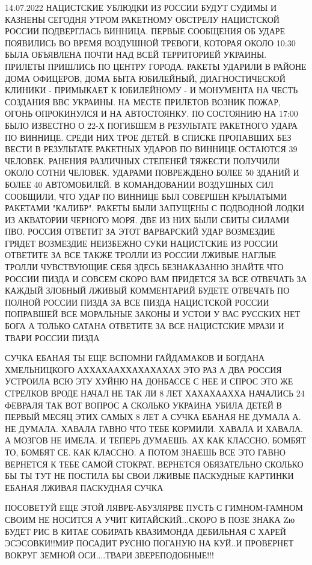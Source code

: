 14.07.2022
НАЦИСТСКИЕ УБЛЮДКИ ИЗ РОССИИ БУДУТ СУДИМЫ И КАЗНЕНЫ СЕГОДНЯ УТРОМ РАКЕТНОМУ
ОБСТРЕЛУ НАЦИСТСКОЙ РОССИИ ПОДВЕРГЛАСЬ ВИННИЦА. ПЕРВЫЕ СООБЩЕНИЯ ОБ УДАРЕ
ПОЯВИЛИСЬ ВО ВРЕМЯ ВОЗДУШНОЙ ТРЕВОГИ, КОТОРАЯ ОКОЛО 10:30 БЫЛА ОБЪЯВЛЕНА ПОЧТИ
НАД ВСЕЙ ТЕРРИТОРИЕЙ УКРАИНЫ. ПРИЛЕТЫ ПРИШЛИСЬ ПО ЦЕНТРУ ГОРОДА. РАКЕТЫ УДАРИЛИ
В РАЙОНЕ ДОМА ОФИЦЕРОВ, ДОМА БЫТА ЮБИЛЕЙНЫЙ, ДИАГНОСТИЧЕСКОЙ КЛИНИКИ
- ПРИМЫКАЕТ К ЮБИЛЕЙНОМУ - И МОНУМЕНТА НА ЧЕСТЬ СОЗДАНИЯ ВВС УКРАИНЫ.  НА МЕСТЕ
ПРИЛЕТОВ ВОЗНИК ПОЖАР, ОГОНЬ ОПРОКИНУЛСЯ И НА АВТОСТОЯНКУ. ПО СОСТОЯНИЮ НА
17:00 БЫЛО ИЗВЕСТНО О 22-Х ПОГИБШЕМ В РЕЗУЛЬТАТЕ РАКЕТНОГО УДАРА ПО ВИННИЦЕ.
СРЕДИ НИХ ТРОЕ ДЕТЕЙ. В СПИСКЕ ПРОПАВШИХ БЕЗ ВЕСТИ В РЕЗУЛЬТАТЕ РАКЕТНЫХ УДАРОВ
ПО ВИННИЦЕ ОСТАЮТСЯ 39 ЧЕЛОВЕК. РАНЕНИЯ РАЗЛИЧНЫХ СТЕПЕНЕЙ ТЯЖЕСТИ ПОЛУЧИЛИ
ОКОЛО СОТНИ ЧЕЛОВЕК. УДАРАМИ ПОВРЕЖДЕНО БОЛЕЕ 50 ЗДАНИЙ И БОЛЕЕ 40 АВТОМОБИЛЕЙ.
В КОМАНДОВАНИИ ВОЗДУШНЫХ СИЛ СООБЩИЛИ, ЧТО УДАР ПО ВИННИЦЕ БЫЛ СОВЕРШЕН
КРЫЛАТЫМИ РАКЕТАМИ "КАЛИБР". РАКЕТЫ БЫЛИ ЗАПУЩЕНЫ С ПОДВОДНОЙ ЛОДКИ ИЗ
АКВАТОРИИ ЧЕРНОГО МОРЯ. ДВЕ ИЗ НИХ БЫЛИ СБИТЫ СИЛАМИ ПВО.  РОССИЯ ОТВЕТИТ ЗА
ЭТОТ ВАРВАРСКИЙ УДАР ВОЗМЕЗДИЕ ГРЯДЕТ ВОЗМЕЗДИЕ НЕИЗБЕЖНО СУКИ НАЦИСТСКИЕ ИЗ
РОССИИ ОТВЕТИТЕ ЗА ВСЕ ТАКЖЕ ТРОЛЛИ ИЗ РОССИИ ЛЖИВЫЕ НАГЛЫЕ ТРОЛЛИ ЧУВСТВУЮЩИЕ
СЕБЯ ЗДЕСЬ БЕЗНАКАЗАННО ЗНАЙТЕ ЧТО РОССИИ ПИЗДА И СОВСЕМ СКОРО ВАМ ПРИДЕТСЯ ЗА
ВСЕ ОТВЕЧАТЬ ЗА КАЖДЫЙ ЗЛОБНЫЙ ЛЖИВЫЙ КОММЕНТАРИЙ БУДЕТЕ ОТВЕЧАТЬ ПО ПОЛНОЙ
РОССИИ ПИЗДА ЗА ВСЕ ПИЗДА НАЦИСТСКОЙ РОССИИ ПОПРАВШЕЙ ВСЕ МОРАЛЬНЫЕ ЗАКОНЫ И
УСТОИ У ВАС РУССКИХ НЕТ БОГА А ТОЛЬКО САТАНА ОТВЕТИТЕ ЗА ВСЕ НАЦИСТСКИЕ МРАЗИ И
ТВАРИ РОССИИ ПИЗДА

СУЧКА ЕБАНАЯ ТЫ ЕЩЕ ВСПОМНИ ГАЙДАМАКОВ И БОГДАНА ХМЕЛЬНИЦКОГО АХХАХААХХАХАХАХАХ
ЭТО РАЗ А ДВА РОССИЯ УСТРОИЛА ВСЮ ЭТУ ХУЙНЮ НА ДОНБАССЕ С НЕЕ И СПРОС ЭТО ЖЕ
СТРЕЛКОВ ВРОДЕ НАЧАЛ НЕ ТАК ЛИ 8 ЛЕТ ХАХАХААХХА НАЧАЛИСЬ 24 ФЕВРАЛЯ ТАК ВОТ
ВОПРОС А СКОЛЬКО УКРАИНА УБИЛА ДЕТЕЙ В ПЕРВЫЙ МЕСЯЦ ЭТИХ САМЫХ 8 ЛЕТ А СУЧКА
ЕБАНАЯ НЕ ДУМАЛА А. НЕ ДУМАЛА. ХАВАЛА ГАВНО ЧТО ТЕБЕ КОРМИЛИ. ХАВАЛА И ХАВАЛА.
А МОЗГОВ НЕ ИМЕЛА. И ТЕПЕРЬ ДУМАЕШЬ. АХ КАК КЛАССНО. БОМБЯТ ТО, БОМБЯТ СЕ. КАК
КЛАССНО. А ПОТОМ ЗНАЕШЬ ВСЕ ЭТО ГАВНО ВЕРНЕТСЯ К ТЕБЕ САМОЙ СТОКРАТ. ВЕРНЕТСЯ
ОБЯЗАТЕЛЬНО СКОЛЬКО БЫ ТЫ ТУТ НЕ ПОСТИЛА БЫ СВОИ ЛЖИВЫЕ ПАСКУДНЫЕ КАРТИНКИ
ЕБАНАЯ ЛЖИВАЯ ПАСКУДНАЯ СУЧКА 

ПОСОВЕТУЙ ЕЩЕ ЭТОЙ ЛЯВРЕ-АБУЗЛЯРВЕ ПУСТЬ С ГИМНОМ-ГАМНОМ СВОИМ НЕ НОСИТСЯ А
УЧИТ КИТАЙСКИЙ...СКОРО В ПОЗЕ ЗНАКА Zю БУДЕТ РИС В КИТАЕ СОБИРАТЬ КВАЗИМОНДА
ДЕБИЛЬНАЯ С ХАРЕЙ ЭСЭСОВКИ!!МИР ПОСАДИТ РУСНЮ ПОГАНУЮ НА КУЙ..И ПРОВЕРНЕТ
ВОКРУГ ЗЕМНОЙ ОСИ....ТВАРИ ЗВЕРЕПОДОБНЫЕ!!!

